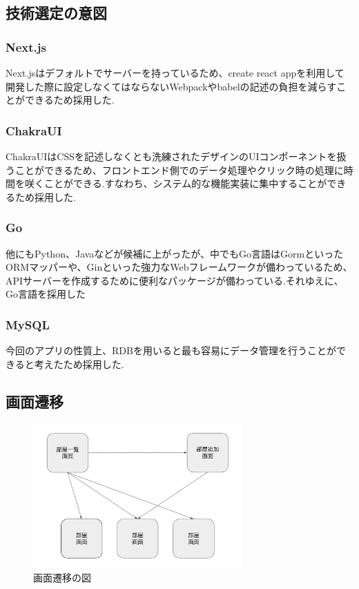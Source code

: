 \documentclass[submit,techrep]{ipsj}
\begin{document}
\subsection{技術選定の意図}
\subsubsection{Next.js}
Next.jsはデフォルトでサーバーを持っているため、create react appを利用して開発した際に設定しなくてはならないWebpackやbabelの記述の負担を減らすことができるため採用した.

\subsubsection{ChakraUI}
ChakraUIはCSSを記述しなくとも洗練されたデザインのUIコンポーネントを扱うことができるため、フロントエンド側でのデータ処理やクリック時の処理に時間を咲くことができる.すなわち、システム的な機能実装に集中することができるため採用した.

\subsubsection{Go}
他にもPython、Javaなどが候補に上がったが、中でもGo言語はGormといったORMマッパーや、Ginといった強力なWebフレームワークが備わっているため、APIサーバーを作成するために便利なパッケージが備わっている.それゆえに、Go言語を採用した

\subsubsection{MySQL}
今回のアプリの性質上、RDBを用いると最も容易にデータ管理を行うことができると考えたため採用した.



\subsection{画面遷移}

\begin{figure}[htbp]
  \centering
 \includegraphics[width=8cm]{./images/screen_transition.jpg}
  \caption{画面遷移の図}
  \label{fig:sample}
\end{figure}
\end{document}
